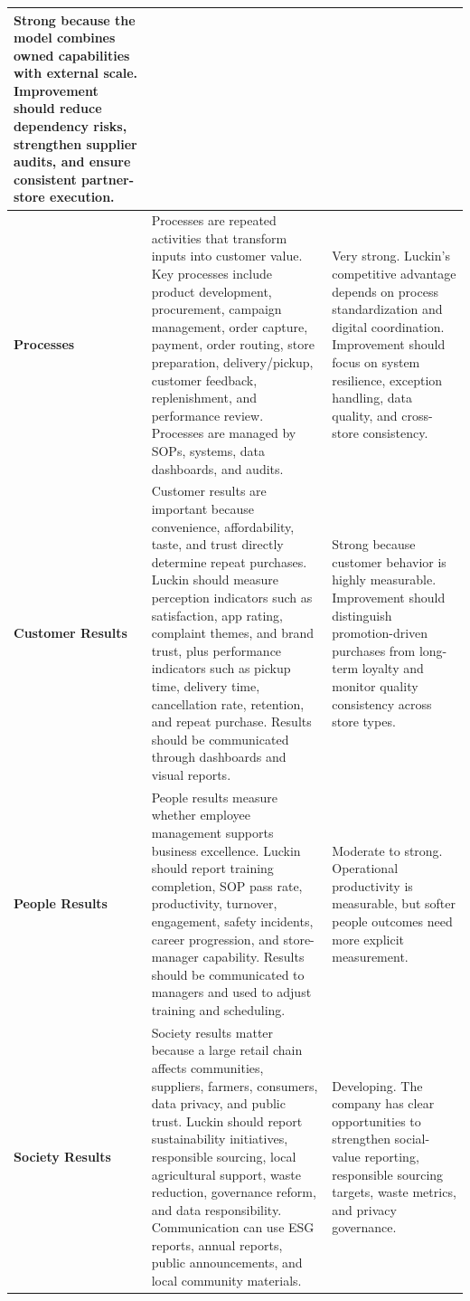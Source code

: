 \documentclass[12pt,a4paper]{article}
\begin{document}
\begin{longtable}{P{2.65cm}P{5.45cm}P{5.95cm}}
Strong because the model combines owned capabilities with external scale. Improvement should reduce dependency risks, strengthen supplier audits, and ensure consistent partner-store execution. \\
\midrule
\textbf{Processes} &
Processes are repeated activities that transform inputs into customer value. Key processes include product development, procurement, campaign management, order capture, payment, order routing, store preparation, delivery/pickup, customer feedback, replenishment, and performance review. Processes are managed by SOPs, systems, data dashboards, and audits. &
Very strong. Luckin's competitive advantage depends on process standardization and digital coordination. Improvement should focus on system resilience, exception handling, data quality, and cross-store consistency. \\
\midrule
\textbf{Customer Results} &
Customer results are important because convenience, affordability, taste, and trust directly determine repeat purchases. Luckin should measure perception indicators such as satisfaction, app rating, complaint themes, and brand trust, plus performance indicators such as pickup time, delivery time, cancellation rate, retention, and repeat purchase. Results should be communicated through dashboards and visual reports. &
Strong because customer behavior is highly measurable. Improvement should distinguish promotion-driven purchases from long-term loyalty and monitor quality consistency across store types. \\
\midrule
\textbf{People Results} &
People results measure whether employee management supports business excellence. Luckin should report training completion, SOP pass rate, productivity, turnover, engagement, safety incidents, career progression, and store-manager capability. Results should be communicated to managers and used to adjust training and scheduling. &
Moderate to strong. Operational productivity is measurable, but softer people outcomes need more explicit measurement. \\
\midrule
\textbf{Society Results} &
Society results matter because a large retail chain affects communities, suppliers, farmers, consumers, data privacy, and public trust. Luckin should report sustainability initiatives, responsible sourcing, local agricultural support, waste reduction, governance reform, and data responsibility. Communication can use ESG reports, annual reports, public announcements, and local community materials. &
Developing. The company has clear opportunities to strengthen social-value reporting, responsible sourcing targets, waste metrics, and privacy governance. \\

\end{longtable}
\end{document}
